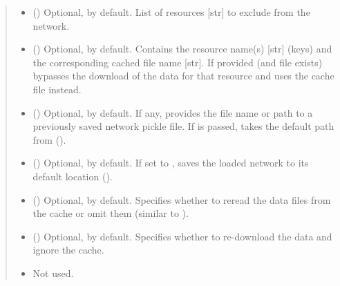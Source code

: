 \documentclass[letterpaper,10pt,english]{sphinxmanual}
\begin{document}
\begin{fulllineitems}
\begin{fulllineitems}
\begin{quote}
\begin{description}
\begin{itemize}
\item {} 
 () \textendash{} Optional, \sphinxcode{\sphinxupquote{{[}{]}}} by default. List of resources {[}str{]} to
exclude from the network.

\item {} 
 () \textendash{} Optional, \sphinxcode{\sphinxupquote{\{\}}} by default. Contains the resource name(s)
{[}str{]} (keys) and the corresponding cached file name {[}str{]}.
If provided (and file exists) bypasses the download of the
data for that resource and uses the cache file instead.

\item {} 
 () \textendash{} Optional,  by default. If any, provides the file
name or path to a previously saved network pickle file.
If  is passed, takes the default path from
{\hyperref[\detokenize{reference:pypath.main.PyPath.save_network}]{}}
().

\item {} 
 () \textendash{} Optional,  by default. If set to , saves
the loaded network to its default location
().

\item {} 
 () \textendash{} Optional,  by default. Specifies whether to reread
the data files from the cache or omit them (similar to
).

\item {} 
 () \textendash{} Optional,  by default. Specifies whether to
re-download the data and ignore the cache.

\item {} 
 \textendash{} Not used.


\end{itemize}
\end{description}
\end{quote}
\end{fulllineitems}
\end{fulllineitems}
\end{document}
